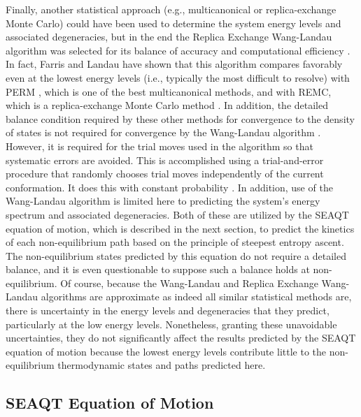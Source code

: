 \documentclass[
journal=jcisd8, %
manuscript=article,
layout=twocolumn   %
]{achemso}
\begin{document}
Finally, another statistical approach (e.g., multicanonical or replica-exchange Monte Carlo) could have been used to determine the system energy levels and associated degeneracies, but in the end the Replica Exchange Wang-Landau algorithm was selected for its balance of accuracy and computational efficiency \cite{Farris2021,Hayashi2019}. In fact, Farris and Landau \cite{Farris2021} have shown that this algorithm compares favorably even at the lowest energy levels (i.e., typically the most difficult to resolve) with PERM \cite{Thachuk2007}, which is one of the best multicanonical methods, and with REMC, which is a replica-exchange Monte Carlo method \cite{Swendsen1986,Geyer1991,Hukushima1996}. In addition, the detailed balance condition required by these other methods for convergence to the density of states is not required for convergence by the Wang-Landau algorithm  \cite{Wust2012,Zhou2008}. However, it is required for the trial moves used in the algorithm so that systematic errors are avoided. This is accomplished using a trial-and-error procedure that randomly chooses trial moves independently of the current conformation. It does this with constant probability \cite{Wust2012}. In addition, use of the Wang-Landau algorithm is limited here to predicting the system's energy spectrum and associated degeneracies. Both of these are utilized by the SEAQT equation of motion, which is described in the next section, to predict the kinetics of each non-equilibrium path based on the principle of steepest entropy ascent. The non-equilibrium states predicted by this equation do not require a detailed balance, and it is even questionable to suppose such a balance holds at non-equilibrium. Of course, because the Wang-Landau and Replica Exchange Wang-Landau algorithms are approximate as indeed all similar statistical methods are, there is uncertainty in the energy levels and degeneracies that they predict, particularly at the low energy levels. Nonetheless, granting these unavoidable uncertainties, they do not significantly affect the results predicted by the SEAQT equation of motion because the lowest energy levels contribute little to the non-equilibrium thermodynamic states and paths predicted here.

\subsection{SEAQT Equation of Motion}\label{SectionIIC}
\end{document}

